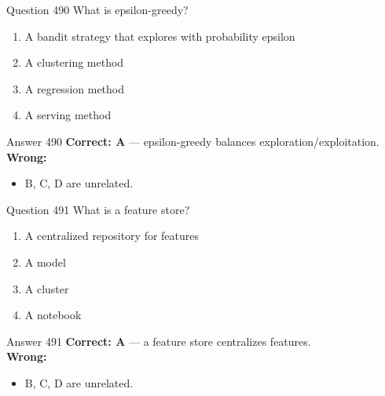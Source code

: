 \documentclass[aspectratio=169,11pt]{beamer}
\begin{document}
	\begin{frame}{Question 490}
		What is epsilon-greedy?
		\begin{enumerate}[label=\Alph*.]
			\item A bandit strategy that explores with probability epsilon
			\item A clustering method
			\item A regression method
			\item A serving method
		\end{enumerate}
	\end{frame}
	\begin{frame}{Answer 490}
		\textbf{Correct: A} --- epsilon-greedy balances exploration/exploitation.\\
		\vspace{0.5em}
		\textbf{Wrong:}
		\begin{itemize}
			\item B, C, D are unrelated.
		\end{itemize}
	\end{frame}
	
	\begin{frame}{Question 491}
		What is a feature store?
		\begin{enumerate}[label=\Alph*.]
			\item A centralized repository for features
			\item A model
			\item A cluster
			\item A notebook
		\end{enumerate}
	\end{frame}
	\begin{frame}{Answer 491}
		\textbf{Correct: A} --- a feature store centralizes features.\\
		\vspace{0.5em}
		\textbf{Wrong:}
		\begin{itemize}
			\item B, C, D are unrelated.
		\end{itemize}
	\end{frame}
	
\end{document}
